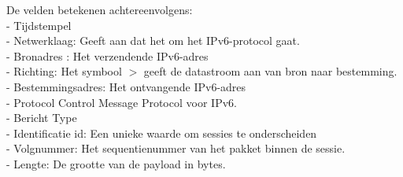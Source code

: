 De velden betekenen achtereenvolgens:\\
- Tijdstempel\\
- Netwerklaag: Geeft aan dat het om het IPv6-protocol gaat.\\
- Bronadres : Het verzendende IPv6-adres\\
- Richting: Het symbool $>$ geeft de datastroom aan van bron naar bestemming.\\
- Bestemmingsadres: Het ontvangende IPv6-adres\\
- Protocol Control Message Protocol voor IPv6.\\
- Bericht Type\\
- Identificatie id: Een unieke waarde om sessies te onderscheiden\\
- Volgnummer: Het sequentienummer van het pakket binnen de sessie.\\
- Lengte: De grootte van de payload in bytes.\\
